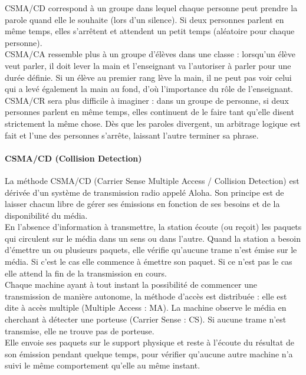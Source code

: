 \documentclass[11pt, a4paper, twoside]{book}
\begin{document}
{CSMA/CD correspond à un groupe dans lequel chaque personne peut prendre la parole quand elle le souhaite (lors d'un silence). Si deux personnes parlent en même temps, elles s'arrêtent et attendent un petit temps (aléatoire pour chaque personne).\\

CSMA/CA ressemble plus à un groupe d'élèves dans une classe : lorsqu'un élève veut parler, il doit lever la main et l'enseignant va l'autoriser à parler pour une durée définie. Si un élève au premier rang lève la main, il ne peut pas voir celui qui a levé également la main au fond, d'où l'importance du rôle de l'enseignant.\\

CSMA/CR sera plus difficile à imaginer : dans un groupe de personne, si deux personnes parlent en même temps, elles continuent de le faire tant qu'elle disent strictement la même chose. Dès que les paroles divergent, un arbitrage logique est fait et l'une des personnes s'arrête, laissant l'autre terminer sa phrase.

\paragraph*{CSMA/CD (Collision Detection)}
La méthode CSMA/CD (Carrier Sense Multiple Access / Collision Detection) est dérivée d'un système de transmission radio appelé Aloha. Son principe est de laisser chacun libre de gérer ses émissions en fonction de ses besoins et de la disponibilité du média.\\

En l'absence d'information à transmettre, la station écoute (ou reçoit) les paquets qui circulent sur le média dans un sens ou dans l'autre. Quand la station a besoin d'émettre un ou plusieurs paquets, elle vérifie qu'aucune trame n'est émise sur le média. Si c'est le cas elle commence à émettre son paquet. Si ce n'est pas le cas elle attend la fin de la transmission en cours. \\

Chaque machine ayant à tout instant la possibilité de commencer une transmission de manière autonome, la méthode d'accès est distribuée : elle est dite à accès multiple (Multiple Access : MA). La machine observe le média en cherchant à détecter une porteuse (Carrier Sense : CS). Si aucune trame n'est transmise, elle ne trouve pas de porteuse.\\

Elle envoie ses paquets sur le support physique et reste à l'écoute du résultat de son émission pendant quelque temps, pour vérifier qu'aucune autre machine n'a suivi le même comportement qu'elle au même instant.\\

}
\end{document}
